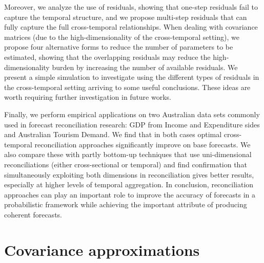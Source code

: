 \documentclass[12pt]{article}
\theoremstyle{definition}
\begin{document}
Moreover, we analyze the use of residuals, showing that one-step residuals fail to capture the temporal structure, and we propose multi-step residuals that can fully capture the full cross-temporal relationships. When dealing with covariance matrices (due to the high-dimensionality of the cross-temporal setting), we propose four alternative forms to reduce the number of parameters to be estimated, showing that the overlapping residuals may reduce the high-dimensionality burden by increasing the number of available residuals. We present a simple simulation to investigate using the different types of residuals in the cross-temporal setting arriving to some useful conclusions. These ideas are worth requiring further investigation in future works.

Finally, we perform empirical applications on two Australian data sets commonly used in forecast reconciliation research: GDP from Income and Expenditure sides and Australian Tourism Demand. We find that in both cases optimal cross-temporal reconciliation approaches significantly improve on base forecasts. We also compare these with partly bottom-up techniques that use uni-dimensional reconciliations (either cross-sectional or temporal) and find confirmation that simultaneously exploiting both dimensions in reconciliation gives better results, especially at higher levels of temporal aggregation. In conclusion, reconciliation approaches can play an important role to improve the accuracy of forecasts in a probabilistic framework while achieving the important attribute of producing coherent forecasts.

\appendix
\setcounter{table}{0}
\renewcommand{\thetable}{\Alph{section}.\arabic{table}}

\section{Covariance approximations}\label{app:covapp}
\end{document}
